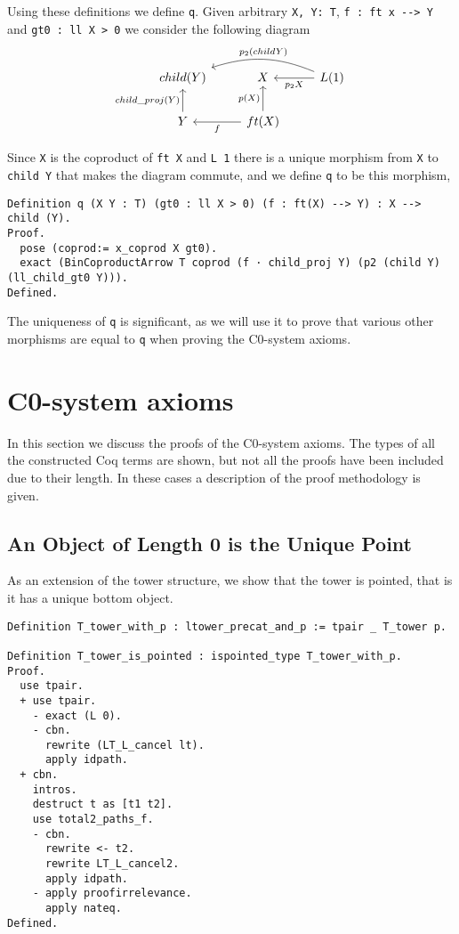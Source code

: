 Using these definitions we define \lstinline|q|. Given arbitrary 
\lstinline|X, Y: T|, \lstinline|f : ft x --> Y| and \lstinline|gt0 : ll X > 0| 
we consider the following diagram
\[
\begin{tikzcd}
    child(Y) &
    X & 
    L(1)
    \ar[l, "p_2 X"]
    \ar[ll, bend right=20, "p_2 (child Y)"'] \\
    Y
    \ar[u, "child\_proj(Y)"] &
    ft(X)
    \ar[u, "p(X)"]
    \ar[l, "f"] &
\end{tikzcd}
\]

Since \lstinline|X| is the coproduct of \lstinline|ft X| and \lstinline|L 1|
there is a unique morphism from \lstinline|X| to \lstinline|child Y| that makes
the diagram commute, and we define \lstinline|q| to be this morphism,
\begin{lstlisting}
Definition q (X Y : T) (gt0 : ll X > 0) (f : ft(X) --> Y) : X --> child (Y).
Proof.
  pose (coprod:= x_coprod X gt0).
  exact (BinCoproductArrow T coprod (f · child_proj Y) (p2 (child Y) (ll_child_gt0 Y))).
Defined.
\end{lstlisting}

The uniqueness of \lstinline|q| is significant, as we will use it to prove that
various other morphisms are equal to \lstinline|q| when proving the C0-system
axioms.

\section{C0-system axioms}
In this section we discuss the proofs of the C0-system axioms. The types of all
the constructed Coq terms are shown, but not all the proofs have been included
due to their length. In these cases a description of the proof methodology is
given.

\subsection{An Object of Length 0 is the Unique Point}
As an extension of the tower structure, we show that the tower is pointed, that
is it has a unique bottom object. 

\begin{lstlisting}
Definition T_tower_with_p : ltower_precat_and_p := tpair _ T_tower p.

Definition T_tower_is_pointed : ispointed_type T_tower_with_p.
Proof.
  use tpair.
  + use tpair.
    - exact (L 0).
    - cbn.
      rewrite (LT_L_cancel lt).
      apply idpath.
  + cbn.
    intros.
    destruct t as [t1 t2].
    use total2_paths_f.
    - cbn.
      rewrite <- t2.
      rewrite LT_L_cancel2.
      apply idpath.
    - apply proofirrelevance.
      apply nateq.
Defined.
\end{lstlisting}

